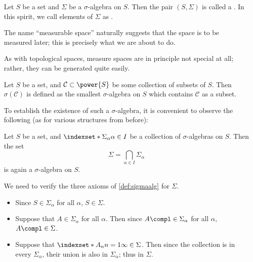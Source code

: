 \begin{definition}
    \label{def:mblspace}
    Let \(S\) be a set
    and \(\Sigma\) be a \(\sigma\)-algebra on \(S\).
    Then the pair \((S,\Sigma)\) is called
    a .
    In this spirit,
    we call elements of \(\Sigma\) as
    .
\end{definition}

The name ``measurable space'' naturally suggests that
the space is to be measured later;
this is precisely what we are about to do.

As with topological spaces,
measure spaces are in principle not special at all;
rather, they can be generated quite easily.

\begin{definition}
    \label{def:gensigmaalg}
    Let \(S\) be a set,
    and \(\mathcal C\subset\power{S}\) be some collection
    of subsets of \(S\).
    Then \(\sigma(\mathcal C)\) is defined as
    the smallest \(\sigma\)-algebra on \(S\)
    which contains \(\mathcal C\) as a subset.
\end{definition}

To establish the existence of such a \(\sigma\)-algebra,
it is convenient to observe the following
(as for various structures from before):
\begin{proposition}
    \label{prop:intersectsigma}
    Let \(S\) be a set,
    and \(\indexset*{\Sigma_\alpha}{\alpha\in I}{}\)
    be a collection of \(\sigma\)-algebras on \(S\).
    Then the set
    \[
        \Sigma
        =\bigcap_{\alpha\in I}\Sigma_\alpha
    \]
    is again a \(\sigma\)-algebra on \(S\).
\end{proposition}
\begin{myproof}
    We need to verify the three axioms of \cref{def:sigmaalg}
    for \(\Sigma\).
    \begin{itemize}
        \item Since \(S\in\Sigma_\alpha\) for all \(\alpha\),
        \(S\in\Sigma\).

        \item Suppose that \(A\in\Sigma_\alpha\) for all \(\alpha\).
        Then since \(A\compl\in\Sigma_\alpha\) for all \(\alpha\),
        \(A\compl\in\Sigma\).

        \item Suppose that \(\indexset*{A_n}{n=1}{\infty}\in\Sigma\).
        Then since the collection is in every \(\Sigma_\alpha\),
        their union is also in \(\Sigma_\alpha\);
        thus in \(\Sigma\).
        \rightqed
    \end{itemize}
\end{myproof}

